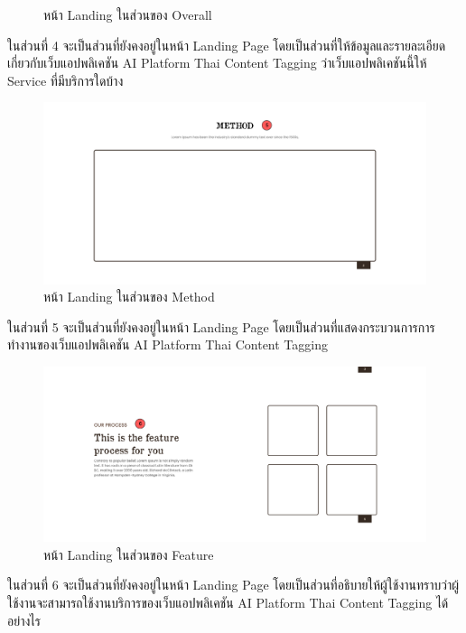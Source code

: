 \documentclass[12pt,oneside,openright,a4paper]{cpe-thai-project}
\begin{document}
\begin{itemize}
\begin{figure}[!ht]
    \caption{หน้า Landing ในส่วนของ Overall}\label{fig:overall} 
  \end{figure}
  \hspace*{1cm}ในส่วนที่ 4 จะเป็นส่วนที่ยังคงอยู่ในหน้า Landing Page โดยเป็นส่วนที่ให้ข้อมูลและรายละเอียดเกี่ยวกับเว็บแอปพลิเคชัน AI Platform Thai Content Tagging
  ว่าเว็บแอปพลิเคชันนี้ให้ Service ที่มีบริการใดบ้าง
  \begin{figure}[!ht]\centering
    \includegraphics[width=14cm]{./img/project_ui/method.png} 
    \caption{หน้า Landing ในส่วนของ Method}\label{fig:method} 
  \end{figure}
  \newline\hspace*{1cm}ในส่วนที่ 5 จะเป็นส่วนที่ยังคงอยู่ในหน้า Landing Page โดยเป็นส่วนที่แสดงกระบวนการการทำงานของเว็บแอปพลิเคชัน AI Platform Thai Content Tagging

  \begin{figure}[!ht]\centering
    \includegraphics[width=13cm]{./img/project_ui/feature.png} 
    \caption{หน้า Landing ในส่วนของ Feature}\label{fig:feature_ui} 
  \end{figure}
  \hspace*{1cm}ในส่วนที่ 6 จะเป็นส่วนที่ยังคงอยู่ในหน้า Landing Page โดยเป็นส่วนที่อธิบายให้ผู้ใช้งานทราบว่าผู้ใช้งานจะสามารถใช้งานบริการของเว็บแอปพลิเคชัน AI Platform Thai Content Tagging
  ได้อย่างไร


\end{itemize}
\end{document}
